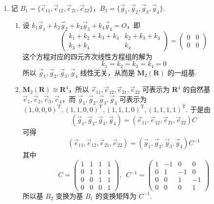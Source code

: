 \begin{enumerate}
    \item 记 $ B_1 = \{\vec{e}_{11}, \vec{e}_{12}, \vec{e}_{21}, \vec{e}_{22}\} $，$ B_2 = \{\vec{g}_1, \vec{g}_2, \vec{g}_3, \vec{g}_4\} $.
          \begin{enumerate}
              \item 设 $ k_1 \vec{g}_1 + k_2 \vec{g}_2 + k_3 \vec{g}_3 + k_4 \vec{g}_4 = O $，即
                    \[ \begin{pmatrix} k_1 + k_2 + k_3 + k_4 & k_2 + k_3 + k_4 \\ k_3 + k_4 & k_4 \end{pmatrix} = \begin{pmatrix} 0 & 0 \\ 0 & 0 \end{pmatrix} \]
                    这个方程对应的四元齐次线性方程组的解为
                    \[ k_1 = k_2 = k_3 = k_4 = 0 \]
                    所以 $ \vec{g}_1, \vec{g}_2, \vec{g}_3, \vec{g}_4 $ 线性无关，从而是 $ \mathbf{M}_2(\mathbf{R}) $ 的一组基.

              \item \label{item:11:B:4:2}
                    $ \mathbf{M}_2(\mathbf{R}) \cong \mathbf{R}^4 $，所以 $ \vec{e}_{11}, \vec{e}_{12}, \vec{e}_{21}, \vec{e}_{22} $ 可表示为 $ \mathbf{R}^4 $ 的自然基 $ \vec{e}_1, \vec{e}_2, \vec{e}_3, \vec{e}_4 $，而 $ \vec{g}_1, \vec{g}_2, \vec{g}_3, \vec{g}_4 $ 可表示为 $ (1, 0, 0, 0)^{\mathrm{T}},\allowbreak (1, 1, 0, 0)^{\mathrm{T}},\allowbreak (1, 1, 1, 0)^{\mathrm{T}},\allowbreak (1, 1, 1, 1)^{\mathrm{T}} $. 于是由
                    \[ (\vec{g}_1, \vec{g}_2, \vec{g}_3, \vec{g}_4) = (\vec{e}_{11}, \vec{e}_{12}, \vec{e}_{21}, \vec{e}_{22}) C \]
                    可得
                    \[ (\vec{e}_{11}, \vec{e}_{12}, \vec{e}_{21}, \vec{e}_{22}) = (\vec{g}_1, \vec{g}_2, \vec{g}_3, \vec{g}_4) C^{-1} \]
                    其中
                    \[ C = \begin{pmatrix}
                            1 & 1 & 1 & 1 \\
                            0 & 1 & 1 & 1 \\
                            0 & 0 & 1 & 1 \\
                            0 & 0 & 0 & 1
                        \end{pmatrix},\enspace C^{-1} = \begin{pmatrix}
                            1 & -1 & 0  & 0  \\
                            0 & 1  & -1 & 0  \\
                            0 & 0  & 1  & -1 \\
                            0 & 0  & 0  & 1
                        \end{pmatrix} \]
                    所以基 $ B_2 $ 变换为基 $ B_1 $ 的变换矩阵为 $ C^{-1} $.


\end{enumerate}
\end{enumerate}
